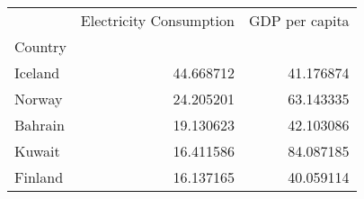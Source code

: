 \begin{tabular}{lrr}
\toprule
{} &  Electricity Consumption &  GDP per capita \\
Country &                          &                 \\
\midrule
Iceland &                44.668712 &       41.176874 \\
Norway  &                24.205201 &       63.143335 \\
Bahrain &                19.130623 &       42.103086 \\
Kuwait  &                16.411586 &       84.087185 \\
Finland &                16.137165 &       40.059114 \\
\bottomrule
\end{tabular}
